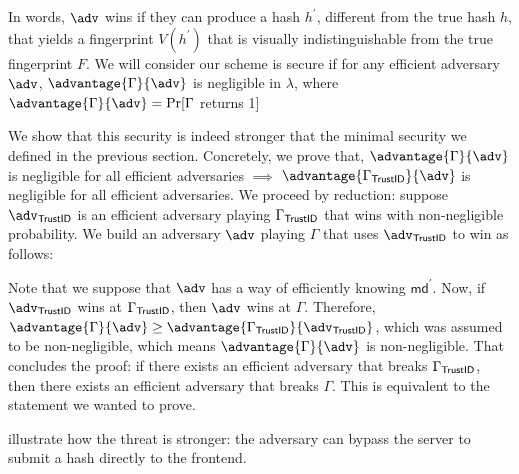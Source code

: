 \documentclass{article}
\begin{document}
In words, $\adv$ wins if they can produce a hash $h^\prime$, different from the true hash $h$, that yields a fingerprint $V(h^\prime)$ that is visually indistinguishable from the true fingerprint $F$. 
We will consider our scheme is secure if for any efficient adversary $\adv$, $\advantage{\Gamma}{\adv}$ is negligible in $\lambda$, where $\advantage{\Gamma}{\adv} = \Pr[\Gamma$ returns 1]

We show that this security is indeed stronger that the minimal security we defined in the previous section. Concretely, we prove that, $\advantage{\Gamma}{\adv}$ is negligible for all efficient adversaries $\implies $ $\advantage{\gid}{\adv}$ is negligible for all efficient adversaries. We proceed by reduction: suppose $\adv_\mathsf{TrustID}$ is an efficient adversary playing $\Gamma_{\mathsf{TrustID}}$ that wins with non-negligible probability. We build an adversary $\adv$ playing $\Gamma$ that uses $\adv_\mathsf{TrustID}$ to win as follows:

\begin{pchstack}[space=2em,center]
\end{pchstack}

Note that we suppose that $\adv$ has a way of efficiently knowing $\mathsf{md^\prime}$. Now, if $\adv_\mathsf{TrustID}$ wins at $\Gamma_{\mathsf{TrustID}}$, then $\adv$ wins at $\Gamma$. Therefore, $\advantage{\Gamma}{\adv} \geq \advantage{\gid}{\adv_\mathsf{TrustID}}$, which was assumed to be non-negligible, which means $\advantage{\Gamma}{\adv}$ is non-negligible.
That concludes the proof: if there exists an efficient adversary that breaks $\Gamma_{\mathsf{TrustID}}$, then there exists an efficient adversary that breaks $\Gamma$. This is equivalent to the statement we wanted to prove.

 illustrate how the threat is stronger: the adversary can bypass the server to submit a hash directly to the frontend.
\end{document}
